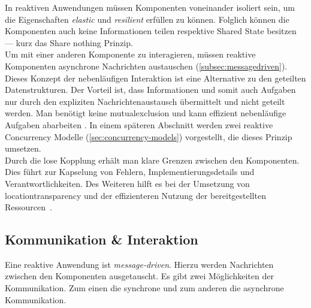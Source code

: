 \pagebreak

In reaktiven Anwendungen müssen Komponenten voneinander isoliert sein, um die Eigenschaften \textit{elastic} und \textit{resilient} erfüllen zu können. Folglich können die Komponenten auch keine Informationen teilen respektive Shared State besitzen --- kurz das Share nothing Prinzip.\\
Um mit einer anderen Komponente zu interagieren, müssen reaktive Komponenten asynchrone Nachrichten austauschen (\ref{subsec:messagedriven}).\\
Dieses Konzept der nebenläufigen Interaktion ist eine Alternative zu den geteilten Datenstrukturen. Der Vorteil ist, dass Informationen und somit auch Aufgaben nur durch den expliziten Nachrichtenaustausch übermittelt und nicht geteilt werden. Man benötigt keine \gls{mutualexclusion} und kann effizient nebenläufige Aufgaben abarbeiten \cite[S.~439]{armstrong_programming_2013}. In einem späteren Abschnitt werden zwei reaktive Concurrency Modelle (\ref{sec:concurrency-models}) vorgestellt, die dieses Prinzip umsetzen.\\

Durch die lose Kopplung erhält man klare Grenzen zwischen den Komponenten. Dies führt zur Kapselung von Fehlern, Implementierungsdetails und Verantwortlichkeiten. Des Weiteren hilft es bei der Umsetzung von \gls{locationtransparency} und der effizienteren Nutzung der bereitgestellten Ressourcen~\cite[S.~45]{kuhn_reactive_2015}.

\pagebreak

\subsection{Kommunikation \& Interaktion}\label{subsec:communication}
Eine reaktive Anwendung ist \textit{message-driven}. Hierzu werden Nachrichten zwischen den Komponenten ausgetauscht. Es gibt zwei Möglichkeiten der Kommunikation. Zum einen die synchrone und zum anderen die asynchrone Kommunikation.

